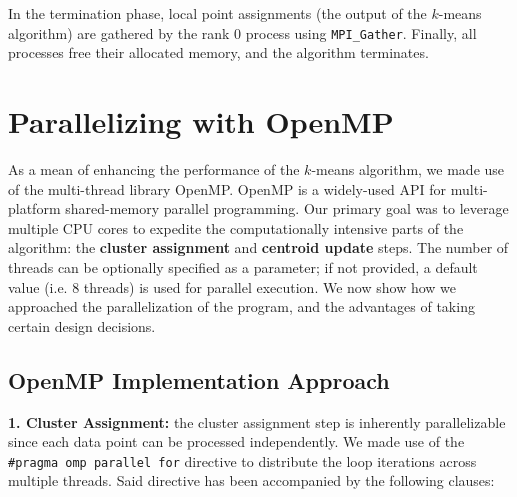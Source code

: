 \documentclass[11pt, journal]{IEEEtran}
\begin{document}
In the termination phase, local point assignments (the output of the $k$-means algorithm) are gathered by the rank 0 process using \texttt{MPI\_Gather}. Finally, all processes free their allocated memory, and the algorithm terminates.

\section{Parallelizing with OpenMP}

As a mean of enhancing the performance of the $k$-means algorithm, we made use of the multi-thread library OpenMP. OpenMP is a widely-used API for multi-platform shared-memory parallel programming. Our primary goal was to leverage multiple CPU cores to expedite the computationally intensive parts of the algorithm: the \textbf{cluster assignment} and \textbf{centroid update} steps. The number of threads can be optionally specified as a parameter; if not provided, a default value (i.e. 8 threads) is used for parallel execution.
We now show how we approached the parallelization of the program, and the advantages of taking certain design decisions.
 
\subsection{OpenMP Implementation Approach}

\noindent \textbf{1. Cluster Assignment:} the cluster assignment step is inherently parallelizable since each data point can be processed independently. We made use of the \texttt{\#pragma omp parallel for} directive to distribute the loop iterations across multiple threads. Said directive has been accompanied by the following clauses:
\end{document}
